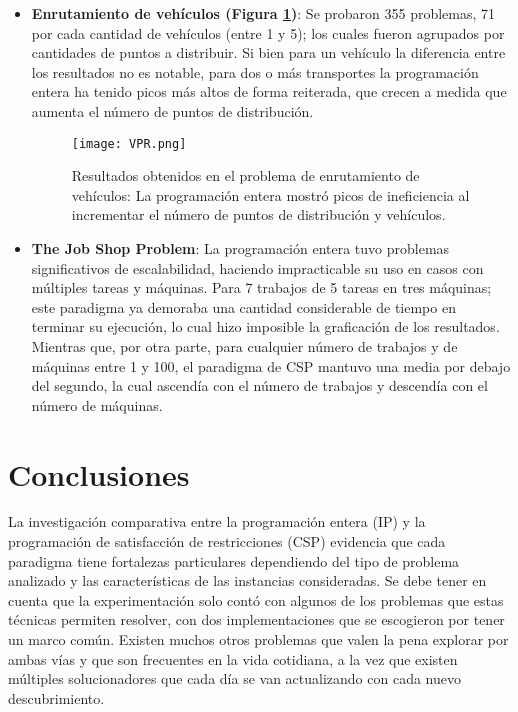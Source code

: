 \documentclass[12pt]{report}
\begin{document}
\begin{itemize}
\newpage

    \item \textbf{Enrutamiento de vehículos (Figura \ref{fig:VPR})}: Se probaron 355 problemas, 71 por cada cantidad de vehículos (entre 1 y 5); los cuales fueron agrupados por cantidades de puntos a distribuir. Si bien para un vehículo la diferencia entre los resultados no es notable, para dos o más transportes la programación entera ha tenido picos más altos de forma reiterada, que crecen a medida que aumenta el número de puntos de distribución.
    \begin{figure}[ht]
    \centering
    \texttt{[image: VPR.png]}
    \caption{Resultados obtenidos en el problema de enrutamiento de vehículos: La programación entera mostró picos de ineficiencia al incrementar el número de puntos de distribución y vehículos.}
    \label{fig:VPR}
    \end{figure}

\newpage
    
    \item \textbf{The Job Shop Problem}: La programación entera tuvo problemas significativos de escalabilidad, haciendo impracticable su uso en casos con múltiples tareas y máquinas. Para 7 trabajos de 5 tareas en tres máquinas; este paradigma ya demoraba una cantidad considerable de tiempo en terminar su ejecución, lo cual hizo imposible la graficación de los resultados. Mientras que, por otra parte, para cualquier número de trabajos y de máquinas entre 1 y 100, el paradigma de CSP mantuvo una media por debajo del segundo, la cual ascendía con el número de trabajos y descendía con el número de máquinas.



\end{itemize}


\chapter{Conclusiones}

La investigación comparativa entre la programación entera (IP) y la programación de satisfacción de restricciones (CSP) evidencia que cada paradigma tiene fortalezas particulares dependiendo del tipo de problema analizado y las características de las instancias consideradas. Se debe tener en cuenta que la experimentación solo contó con algunos de los problemas que estas técnicas permiten resolver, con dos implementaciones que se escogieron por tener un marco común. Existen muchos otros problemas que valen la pena explorar por ambas vías y que son frecuentes en la vida cotidiana, a la vez que existen múltiples solucionadores que cada día se van actualizando con cada nuevo descubrimiento. \\
\end{document}
